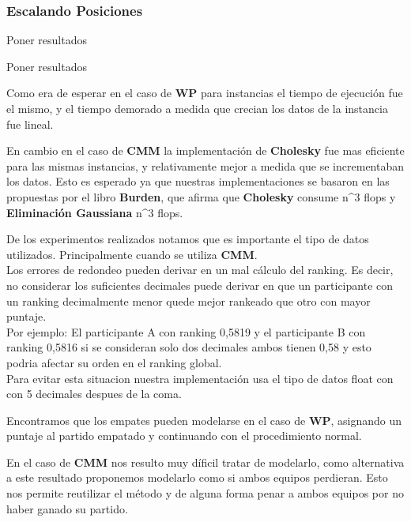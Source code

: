 \subsubsection{Escalando Posiciones}


Poner resultados



Poner resultados




Como era de esperar en el caso de \textbf{WP} para instancias el tiempo de ejecución fue el mismo, y el tiempo demorado a medida que crecian los datos de la instancia fue lineal.

En cambio en el caso de \textbf{CMM} la implementación de \textbf{Cholesky} fue mas eficiente para las mismas instancias, y relativamente mejor a medida que se incrementaban los datos. Esto es esperado ya que nuestras implementaciones se basaron en las propuestas por el libro \textbf{Burden}, que afirma que \textbf{Cholesky} consume  n^3 flops y \textbf{Eliminación Gaussiana}  n^3 flops.



De los experimentos realizados notamos que es importante el tipo de datos utilizados. Principalmente cuando se utiliza \textbf{CMM}.
\\

Los errores de redondeo pueden derivar en un mal cálculo del ranking. Es decir, no considerar los suficientes decimales puede derivar en que un participante con un ranking decimalmente menor quede mejor rankeado que otro con mayor puntaje.\\

Por ejemplo: El participante A con ranking 0,5819 y el participante B con ranking 0,5816 si se consideran solo dos decimales ambos tienen 0,58 y esto podria afectar su orden en el ranking global. \\

Para evitar esta situacion nuestra implementación usa el tipo de datos float con con 5 decimales despues de la coma.\\



Encontramos que los empates pueden modelarse en el caso de \textbf{WP}, asignando un puntaje al partido empatado y continuando con el procedimiento normal.

En el caso de \textbf{CMM} nos resulto muy díficil tratar de modelarlo, como alternativa a este resultado proponemos modelarlo como si ambos equipos perdieran. Esto nos permite reutilizar el método y de alguna forma penar a ambos equipos por no haber ganado su partido.
















